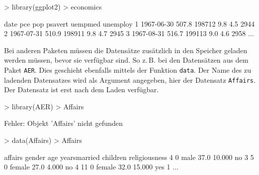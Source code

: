 \begin{Schunk}
\begin{Sinput}
> library(ggplot2)
> economics
\end{Sinput}
\end{Schunk}

\vspace{-5mm} 
\begin{Schunk}
\begin{Soutput}
          date    pce    pop psavert uempmed unemploy
1   1967-06-30  507.8 198712     9.8     4.5     2944
2   1967-07-31  510.9 198911     9.8     4.7     2945
3   1967-08-31  516.7 199113     9.0     4.6     2958
...  
 \end{Soutput} 
\end{Schunk}
    
Bei anderen Paketen müssen die Datensätze zusätzlich in den Speicher geladen werden müssen, bevor sie verfügbar sind. So z.\,B. bei den Datensätzen aus dem Paket \verb!AER!. Dies geschieht ebenfalls mittels der Funktion \verb!data!. Der Name des zu ladenden Datensatzes wird als Argument angegeben, hier der Datensatz \verb!Affairs!. Der Datensatz ist erst nach dem Laden verfügbar.

\begin{Schunk}
\begin{Sinput}
> library(AER)
> Affairs
\end{Sinput}
\end{Schunk}   

\vspace{-5mm}  
\begin{Schunk}
\begin{Soutput}
Fehler: Objekt 'Affairs' nicht gefunden
\end{Soutput} 
\end{Schunk} 
  
\vspace{-5mm} 
\begin{Schunk}
\begin{Sinput}
> data(Affairs)
> Affairs 
\end{Sinput}
\end{Schunk} 

\vspace{-5mm} 
\begin{Schunk}
\begin{Soutput}
     affairs gender  age yearsmarried children religiousness
4          0   male 37.0       10.000       no             3
5          0 female 27.0        4.000       no             4
11         0 female 32.0       15.000      yes             1
...
 \end{Soutput} 
\end{Schunk} 

